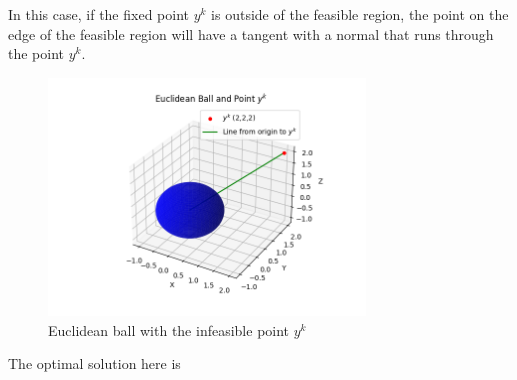In this case, if the fixed point $y^k$ is outside of the feasible region, the point on the edge of the feasible region will have a tangent with a normal that runs through the point $y^k$.
\begin{figure}[htbp]
  \centerline{\includegraphics[width=0.75\textwidth]{images/euclidean_ball.png}}
  \caption{Euclidean ball with the infeasible point $y^k$}
  \label{fig:euclidean_ball}
\end{figure}

The optimal solution here is
